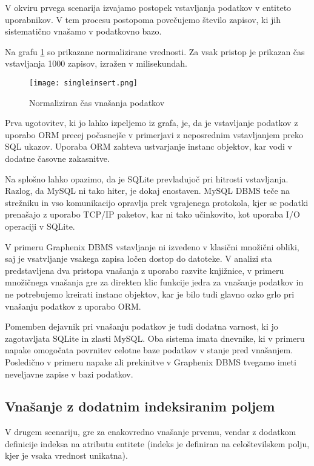 \documentclass[a4paper,12pt,openright]{book}
\begin{document}
    V okviru prvega scenarija izvajamo postopek vstavljanja podatkov v entiteto uporabnikov. V tem procesu postopoma povečujemo število zapisov, ki jih sistematično vnašamo v podatkovno bazo.

    Na grafu \ref{vnos} so prikazane normalizirane vrednosti. Za vsak pristop je prikazan čas vstavljanja 1000 zapisov, izražen v milisekundah.
   
   \begin{figure}[H]
        \centerline{\texttt{[image: singleinsert.png]}}
        \caption{Normaliziran čas vnašanja podatkov}
        \label{vnos}
    \end{figure}

    \noindent
    Prva ugotovitev, ki jo lahko izpeljemo iz grafa, je, da je vstavljanje podatkov z uporabo ORM precej počasnejše v primerjavi z neposrednim vstavljanjem preko SQL ukazov. Uporaba ORM zahteva ustvarjanje instanc objektov, kar vodi v dodatne časovne zakasnitve.

    Na splošno lahko opazimo, da je SQLite prevladujoč pri hitrosti vstavljanja. Razlog, da MySQL ni tako hiter, je dokaj enostaven. MySQL DBMS teče na strežniku in vso komunikacijo opravlja prek vgrajenega protokola, kjer se podatki prenašajo z uporabo TCP/IP paketov, kar ni tako učinkovito, kot uporaba I/O operaciji v SQLite.

    V primeru Graphenix DBMS vstavljanje ni izvedeno v klasični množični obliki, saj je vsatvljanje vsakega zapisa ločen dostop do datoteke. V analizi sta predstavljena dva pristopa vnašanja z uporabo razvite knjižnice, v primeru množičnega vnašanja gre za direkten klic funkcije jedra za vnašanje podatkov in ne potrebujemo kreirati instanc objektov, kar je bilo tudi glavno ozko grlo pri vnašanju podatkov z uporabo ORM.

    Pomemben dejavnik pri vnašanju podatkov je tudi dodatna varnost, ki jo zagotavljata SQLite in zlasti MySQL. Oba sistema imata dnevnike, ki v primeru napake omogočata povrnitev celotne baze podatkov v stanje pred vnašanjem. Posledično v primeru napake ali prekinitve v Graphenix DBMS tvegamo imeti neveljavne zapise v bazi podatkov.

    \subsection{Vnašanje z dodatnim indeksiranim poljem}

    V drugem scenariju, gre za enakovredno vnašanje prvemu, vendar z dodatkom definicije indeksa na atributu entitete (indeks je definiran na celoštevilskem polju, kjer je vsaka vrednost unikatna).
    
\end{document}
